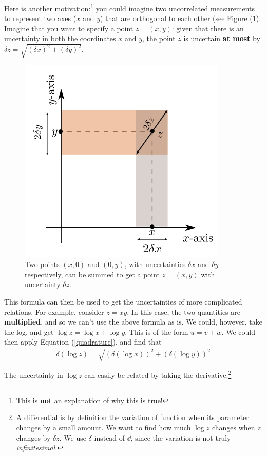 Here is another motivation:\footnote{This is \textbf{not} an explanation of why this is true!} you could imagine two uncorrelated measurements to represent two axes ($x$ and $y$) that are orthogonal to each other (see Figure (\ref{fig:quadrature}). Imagine that you want to specify a point $z = (x,y)$: given that there is an uncertainty in both the coordinates $x$ and $y$, the point $z$ is uncertain \textbf{at most} by $\delta z = \sqrt{\left(\delta x\right)^2+\left(\delta y\right)^2}$.

\begin{figure}
    \centering
    \includegraphics[scale=0.5]{figs/quadrature.png}
    \caption{Two points $(x,0)$ and $(0,y)$, with uncertainties $\delta x$ and $\delta y$ respectively, can be summed to get a point $z=(x,y)$ with uncertainty $\delta z$. }
    \label{fig:quadrature}
\end{figure}

This formula can then be used to get the uncertainties of more complicated relations. For example, consider $z = xy$. In this case, the two quantities are \textbf{multiplied}, and so we can't use the above formula as is. We could, however, take the log, and get $\log{z} = \log{x} + \log{y}$. This is of the form $u = v + w$. We could then apply Equation (\ref{quadrature}), and find that $$\delta \left(\log{z}\right) = \sqrt{\left(\delta \left(\log{x}\right)\right)^2 + \left(\delta \left(\log{y}\right)\right)^2}$$

The uncertainty in $\log{z}$ can easily be related by taking the derivative.\footnote{A differential is by definition the variation of function when its parameter changes by a small amount. We want to find how much $\log{z}$ changes when $z$ changes by $\delta z$. We use $\delta$ instead of $\dd$, since the variation is not truly \textit{infinitesimal}.}

